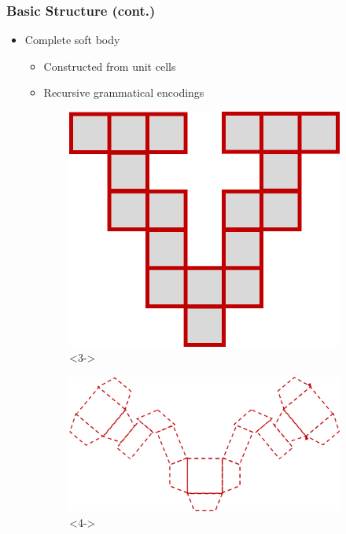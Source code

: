 \documentclass[serif, pdf]{beamer}
\begin{document}
\begin{frame}
    \frametitle{Basic Structure (cont.)}
    \begin{itemize}
        \item<1-> Complete soft body
        \changefontsizes{11pt}
        \begin{itemize}
            \item<2-> Constructed from unit cells
            \item<5-> Recursive grammatical encodings
        \end{itemize}
    \end{itemize}
    \begin{figure}[ht!]
        \captionsetup{skip=0.333\baselineskip}
        \centering
        \begin{subfigure}{.49\textwidth}
            \centering
            \includegraphics[width=0.6\linewidth]{Soft_Body_Undeformed.png}<3->
        \end{subfigure}
        \begin{subfigure}{.49\textwidth}
            \centering
            \includegraphics[width=1\linewidth]{Soft_Body_Deformed.png}<4->
        \end{subfigure}
    \end{figure}
\end{frame}
\end{document}
